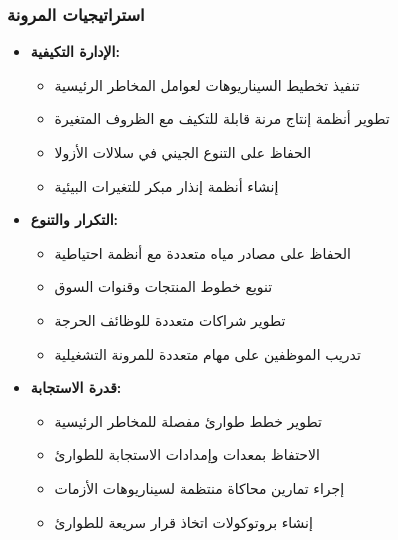 \subsubsection{استراتيجيات المرونة}
\begin{itemize}
    \item \textbf{الإدارة التكيفية:}
    \begin{itemize}
        \item تنفيذ تخطيط السيناريوهات لعوامل المخاطر الرئيسية
        \item تطوير أنظمة إنتاج مرنة قابلة للتكيف مع الظروف المتغيرة
        \item الحفاظ على التنوع الجيني في سلالات الأزولا
        \item إنشاء أنظمة إنذار مبكر للتغيرات البيئية
    \end{itemize}
    
    \item \textbf{التكرار والتنوع:}
    \begin{itemize}
        \item الحفاظ على مصادر مياه متعددة مع أنظمة احتياطية
        \item تنويع خطوط المنتجات وقنوات السوق
        \item تطوير شراكات متعددة للوظائف الحرجة
        \item تدريب الموظفين على مهام متعددة للمرونة التشغيلية
    \end{itemize}
    
    \item \textbf{قدرة الاستجابة:}
    \begin{itemize}
        \item تطوير خطط طوارئ مفصلة للمخاطر الرئيسية
        \item الاحتفاظ بمعدات وإمدادات الاستجابة للطوارئ
        \item إجراء تمارين محاكاة منتظمة لسيناريوهات الأزمات
        \item إنشاء بروتوكولات اتخاذ قرار سريعة للطوارئ
    \end{itemize}
\end{itemize}
